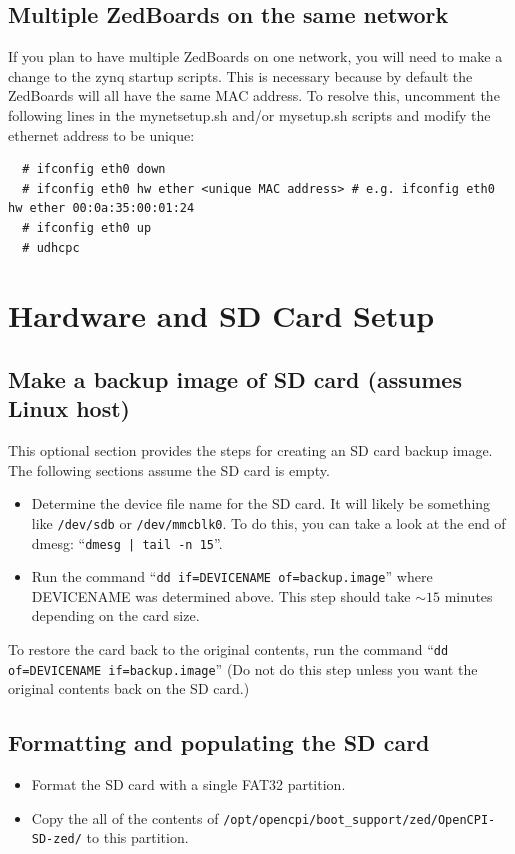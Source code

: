 \subsection{Multiple ZedBoards on the same network}
If you plan to have multiple ZedBoards on one network, you will need to make a change to the zynq startup scripts. This is necessary because by default the ZedBoards will all have the same MAC address. To resolve this, uncomment the following lines in the mynetsetup.sh and/or mysetup.sh scripts and modify the ethernet address to be unique:
\begin{verbatim}
  # ifconfig eth0 down
  # ifconfig eth0 hw ether <unique MAC address> # e.g. ifconfig eth0 hw ether 00:0a:35:00:01:24
  # ifconfig eth0 up
  # udhcpc
\end{verbatim}
\section{Hardware and SD Card Setup}
\label{sec:HW_Setup}
\subsection*{Make a backup image of SD card (assumes Linux host)}
This optional section provides the steps for creating an SD card backup image. The following sections assume the SD card is empty.
\begin{itemize}
\item Determine the device file name for the SD card. It will likely be something like \texttt{/dev/sdb} or \texttt{/dev/mmcblk0}. To do this, you can take a look at the end of dmesg: ``\texttt{dmesg | tail -n 15}''.
\item Run the command ``\texttt{dd if=DEVICENAME of=backup.image}'' where DEVICENAME was determined above. This step should take $\sim15$ minutes depending on the card size.
\end{itemize}
\noindent To restore the card back to the original contents, run the command ``\texttt{dd of=DEVICENAME if=backup.image}'' (Do not do this step unless you want the original contents back on the SD card.)
\subsection*{Formatting and populating the SD card}
\begin{itemize}
\item Format the SD card with a single FAT32 partition.
\item Copy the all of the contents of \texttt{/opt/opencpi/boot\_support/zed/OpenCPI-SD-zed/} to this partition.
\end{itemize}
